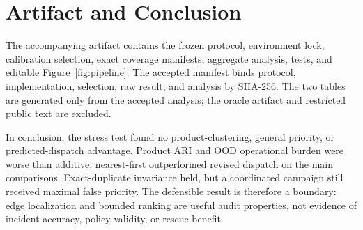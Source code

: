 \documentclass[runningheads]{llncs}
\begin{document}
\section{Artifact and Conclusion}

The accompanying artifact contains the frozen protocol, environment lock,
calibration selection, exact coverage manifests, aggregate analysis, tests,
and editable Figure~\ref{fig:pipeline}. The accepted manifest binds protocol,
implementation, selection, raw result, and analysis by SHA-256. The two tables
are generated only from the accepted analysis; the oracle artifact and
restricted public text are excluded.

In conclusion, the stress test found no product-clustering, general priority,
or predicted-dispatch advantage. Product ARI and OOD operational burden were
worse than additive; nearest-first outperformed revised dispatch on the main
comparisons. Exact-duplicate invariance held, but a coordinated campaign still
received maximal false priority. The defensible result is therefore a boundary:
edge localization and bounded ranking are useful audit properties, not evidence
of incident accuracy, policy validity, or rescue benefit.



\end{document}
